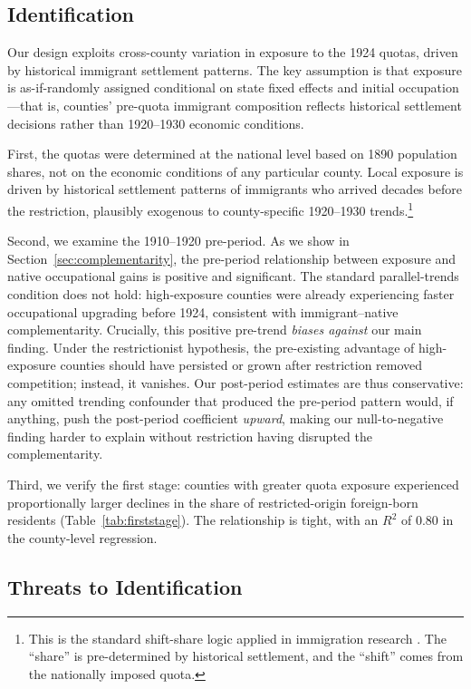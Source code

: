 \documentclass[12pt]{article}
\begin{document}
\subsection{Identification}

Our design exploits cross-county variation in exposure to the 1924 quotas, driven by historical immigrant settlement patterns. The key assumption is that exposure is as-if-randomly assigned conditional on state fixed effects and initial occupation---that is, counties' pre-quota immigrant composition reflects historical settlement decisions rather than 1920--1930 economic conditions.

First, the quotas were determined at the national level based on 1890 population shares, not on the economic conditions of any particular county. Local exposure is driven by historical settlement patterns of immigrants who arrived decades before the restriction, plausibly exogenous to county-specific 1920--1930 trends.\footnote{This is the standard shift-share logic applied in immigration research \citep{card2001}. The ``share'' is pre-determined by historical settlement, and the ``shift'' comes from the nationally imposed quota.}

Second, we examine the 1910--1920 pre-period. As we show in Section~\ref{sec:complementarity}, the pre-period relationship between exposure and native occupational gains is positive and significant. The standard parallel-trends condition does not hold: high-exposure counties were already experiencing faster occupational upgrading before 1924, consistent with immigrant--native complementarity. Crucially, this positive pre-trend \textit{biases against} our main finding. Under the restrictionist hypothesis, the pre-existing advantage of high-exposure counties should have persisted or grown after restriction removed competition; instead, it vanishes. Our post-period estimates are thus conservative: any omitted trending confounder that produced the pre-period pattern would, if anything, push the post-period coefficient \textit{upward}, making our null-to-negative finding harder to explain without restriction having disrupted the complementarity.

Third, we verify the first stage: counties with greater quota exposure experienced proportionally larger declines in the share of restricted-origin foreign-born residents (Table~\ref{tab:firststage}). The relationship is tight, with an $R^2$ of 0.80 in the county-level regression.

\subsection{Threats to Identification}
\end{document}
